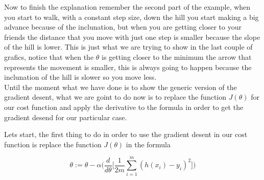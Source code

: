 \documentclass[12pt,journal]{IEEEtran}
\begin{document}

    \newpage

    Now to finish the explanation remember the second part of the example, when
    you start to walk, with a constant step size, down the hill you start
    making a big advance because of the inclunation, but when you are getting
    closer to your friends the distance that you move with just one step is
    smaller because the slope of the hill is lower. This is just what we are
    trying to show in the last couple of grafics, notice that when the $\theta$
    is getting closer to the minimum the arrow that represents the movement is
    smaller, this is always going to happen because the inclunation of the hill
    is slower so you move less.\\

    Until the moment what we have done is to show the generic version of the
    gradient desent, what we are goint to do now is to replace the function
    $J(\theta)$ for our cost function and apply the derivative to the formula
    in order to get the gradient desend for our particular case.

    Lets start, the first thing to do in order to use the gradient desent in our
    cost function is replace the function $J(\theta)$ in the formula

    \begin{equation}
        \theta := \theta - \alpha
            \Bigg(
                \frac{d}{d \theta}
                    \Bigg[
                        \frac{1}{2m} \sum_{i=1}^{m} ( h(x_i) - y_i )^2
                    \Bigg]
            \Bigg)
    \end{equation}
\end{document}
